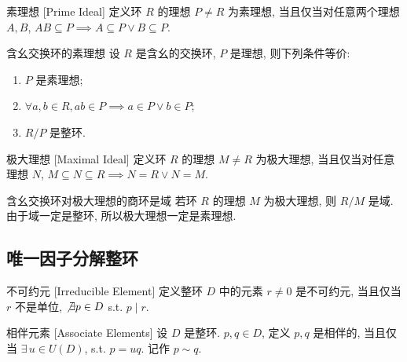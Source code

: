         \begin{dfn}
            {素理想}
            [Prime Ideal]
            定义环 \(R\) 的理想 \(P\neq R\) 为素理想, 当且仅当对任意两个理想 $A,B$, \(AB\subseteq P\implies A\subseteq P\lor B\subseteq P\).
        \end{dfn}

        \begin{crl}
            {含幺交换环的素理想}
            设 \(R\) 是含幺的交换环, \(P\) 是理想, 则下列条件等价:
            \begin{enumerate}[label=(\arabic*)]
                \item \(P\) 是素理想;
                \item \(\forall a,b\in R, ab\in P\implies a\in P\lor b\in P\);
                \item \(R/P\) 是整环.
            \end{enumerate}
        \end{crl}

        \begin{dfn}
            {极大理想}
            [Maximal Ideal]
            定义环 \(R\) 的理想 \(M\neq R\) 为极大理想, 当且仅当对任意理想 \(N\), \(M\subseteq N\subseteq R\implies N=R\lor N=M\).
        \end{dfn}

        \begin{crl}
            {含幺交换环对极大理想的商环是域}
            若环 \(R\) 的理想 \(M\) 为极大理想, 则 \(R/M\) 是域.\\
            由于域一定是整环, 所以极大理想一定是素理想.
        \end{crl}

    \subsection{唯一因子分解整环}

        \begin{dfn}
            {不可约元}
            [Irreducible Element]
            定义整环 \(D\) 中的元素 \(r\neq 0\) 是不可约元, 当且仅当 \(r\) 不是单位, \(\not\exists p\in D\) s.t. \(p\mid r\).
        \end{dfn}

        \begin{dfn}
            [Associate]
            {相伴元素}
            [Associate Elements]
            设 \(D\) 是整环. \(p,q\in D\), 定义 \(p,q\) 是相伴的, 当且仅当 \(\exists\,u\in U(D)\), s.t. \(p=uq\). 记作 \(p\sim q\).
        \end{dfn}


